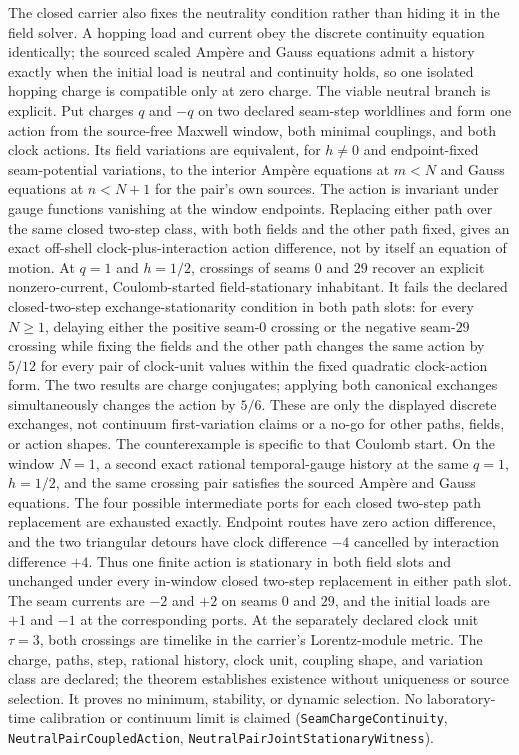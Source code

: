 \documentclass[11pt]{article}
\begin{document}
The closed carrier also fixes the neutrality condition rather than hiding it
in the field solver.  A hopping load and current obey the discrete continuity
equation identically; the sourced scaled Amp\`ere and Gauss equations admit a
history exactly when the initial load is neutral and continuity holds, so one
isolated hopping charge is compatible only at zero charge.  The viable
neutral branch is explicit.  Put charges $q$ and $-q$ on two declared
seam-step worldlines and form one action from the source-free Maxwell window,
both minimal couplings, and both clock actions.  Its field variations are
equivalent, for $h\ne0$ and endpoint-fixed seam-potential variations, to the
interior Amp\`ere equations at $m<N$ and Gauss equations at $n<N+1$ for the
pair's own sources.  The action is invariant under gauge functions vanishing
at the window endpoints.  Replacing either path over the same closed two-step
class, with both fields and the other path fixed, gives an exact off-shell
clock-plus-interaction action difference, not by itself an equation of motion.
At $q=1$ and $h=1/2$, crossings of seams $0$ and $29$ recover an explicit
nonzero-current, Coulomb-started field-stationary inhabitant.  It fails the
declared closed-two-step exchange-stationarity condition in both path slots:
for every $N\ge1$, delaying either the positive seam-$0$ crossing or the
negative seam-$29$ crossing while fixing the fields and the other path changes
the same action by $5/12$ for every pair of clock-unit values within the fixed
quadratic clock-action form.  The two results are charge conjugates; applying
both canonical exchanges simultaneously changes the action by $5/6$.  These
are only the displayed discrete exchanges, not continuum first-variation
claims or a no-go for other paths, fields, or action shapes.
The counterexample is specific to that Coulomb start.  On the window $N=1$,
a second exact rational temporal-gauge history at the same $q=1$, $h=1/2$,
and the same crossing pair satisfies the sourced Amp\`ere and Gauss equations.
The four possible intermediate ports for each closed two-step path replacement
are exhausted exactly.  Endpoint routes have zero action difference, and the
two triangular detours have clock difference $-4$ cancelled by interaction
difference $+4$.  Thus one finite action is stationary in both field slots and
unchanged under every in-window closed two-step replacement in either path
slot.  The seam currents are $-2$ and $+2$ on seams $0$ and $29$, and the
initial loads are $+1$ and $-1$ at the corresponding ports.  At the separately
declared clock unit $\tau=3$, both crossings are timelike in the carrier's
Lorentz-module metric.  The charge, paths, step, rational history, clock unit,
coupling shape, and variation class are declared; the theorem establishes
existence without uniqueness or source selection. It proves no minimum,
stability, or dynamic selection. No laboratory-time
calibration or continuum limit is claimed
(\texttt{SeamChargeContinuity},
\texttt{NeutralPairCoupledAction},
\texttt{NeutralPairJointStationaryWitness}).
\end{document}
